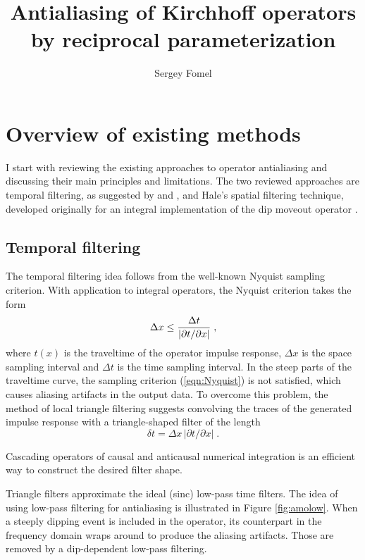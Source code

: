 
\title{Antialiasing of Kirchhoff operators by reciprocal
  parameterization}

\author{Sergey Fomel}



\section{Overview of existing methods}

I start with reviewing the existing approaches to operator
antialiasing and discussing their main principles and limitations. The
two reviewed approaches are temporal filtering, as suggested by
 and , and Hale's spatial
filtering technique, developed originally for an integral
implementation of the dip moveout operator \cite{GEO56.06.07950805}.

\subsection{Temporal filtering}
The temporal filtering idea follows
from the well-known Nyquist sampling criterion. With application to
integral operators, the Nyquist criterion takes the form
\begin{equation}
\Delta x \leq {{\Delta t} \over {|\partial t / \partial x|}}\;,
\label{eqn:Nyquist}
\end{equation}
where $t(x)$ is the traveltime of the operator impulse response,
$\Delta x$ is the space sampling interval and $\Delta t$ is the time
sampling interval. In the steep parts of the traveltime curve, the
sampling criterion (\ref{eqn:Nyquist}) is not satisfied, which causes
aliasing artifacts in the output data. To overcome this problem, the
method of local triangle filtering
\cite{Claerbout.sep.73.371,SEG-1994-1282} suggests convolving the
traces of the generated impulse response with a triangle-shaped filter
of the length
\begin{equation}
\delta t = \Delta x\,|\partial t / \partial x|\;.
\label{eqn:dt}
\end{equation}


Cascading operators of causal and anticausal numerical integration is
an efficient way to construct the desired filter shape.

Triangle filters approximate the ideal (sinc) low-pass time filters.
The idea of using low-pass filtering for antialiasing \cite{gray} is
illustrated in Figure \ref{fig:amolow}. When a steeply dipping event
is included in the operator, its counterpart in the frequency domain
wraps around to produce the aliasing artifacts. Those are removed by a
dip-dependent low-pass filtering.

